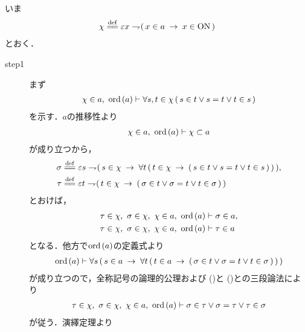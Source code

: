 	\begin{sketch}
		いま
		\begin{align}
			\chi \defeq \varepsilon x \negation 
			(\, x \in a \rarrow x \in \ON\, )
		\end{align}
		とおく．
		\begin{description}
			\item[step1] まず
				\begin{align}
					\chi \in a,\ \operatorname*{ord}\hspace{0.15em}(a) \vdash 
					\forall s,t \in \chi\, (\, s \in t \vee s = t \vee t \in s\, )
					\label{fom:thm_transitive_totally_ordered_class_1}
				\end{align}
				を示す．$a$の推移性より
				\begin{align}
					\chi \in a,\ \operatorname*{ord}\hspace{0.15em}(a) \vdash \chi \subset a
				\end{align}
				が成り立つから，
				\begin{align}
					\sigma &\defeq \varepsilon s \negation 
					(\, s \in \chi \rarrow \forall t\, (\, t \in \chi \rarrow 
					(\, s \in t \vee s = t \vee t \in s\, )\, )\, ), \\
					\tau &\defeq \varepsilon t \negation (\, t \in \chi \rarrow 
					(\, \sigma \in t \vee \sigma = t \vee t \in \sigma\, )\, )
				\end{align}
				とおけば，
				\begin{align}
					\tau \in \chi,\ \sigma \in \chi,\ \chi \in a,\ \ord{a} 
					&\vdash \sigma \in a, 
					\label{fom:thm_transitive_totally_ordered_class_2} \\
					\tau \in \chi,\ \sigma \in \chi,\ \chi \in a,\ \ord{a} 
					&\vdash \tau \in a
					\label{fom:thm_transitive_totally_ordered_class_3}
				\end{align}
				となる．他方で$\operatorname*{ord}\hspace{0.15em}(a)$の定義式より
				\begin{align}
					\operatorname*{ord}\hspace{0.15em}(a) \vdash 
					\forall s\, (\, s \in a \hspace{0.25em}\rightarrow\hspace{0.25em} 
					\forall t\, (\, t \in a \hspace{0.25em}\rightarrow\hspace{0.25em} (\, \sigma \in t \vee \sigma = t \vee t \in \sigma\, )\, )\, )
					\label{fom:thm_transitive_totally_ordered_class_4}
				\end{align}
				が成り立つので，全称記号の論理的公理および
				()と
				()との三段論法により
				\begin{align}
					\tau \in \chi,\ \sigma \in \chi,\ \chi \in a,\ \ord{a} \vdash 
					\sigma \in \tau \vee \sigma = \tau \vee \tau \in \sigma
				\end{align}
				が従う．演繹定理より
				\begin{align}

\end{align}
\end{description}
\end{sketch}

